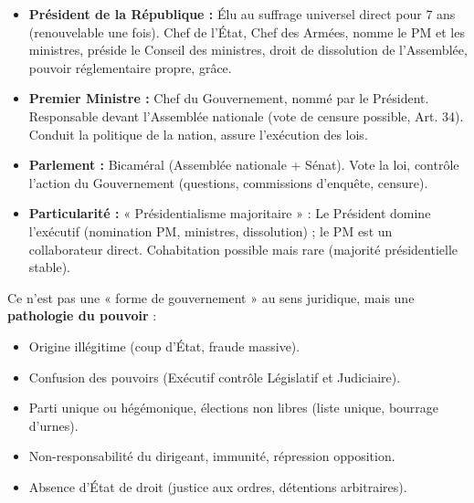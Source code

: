 \documentclass[11pt]{article}
\newcounter{popsec}
\newcounter{popsub}
\newcommand{\courssub}[1]{%
  \stepcounter{popsub}%
  \par\vspace{9pt}\noindent{\popxbold\fontsize{11.5}{13}\selectfont\color{popink}{\color{poporange}\thepopsec.\thepopsub}\hspace{6pt}#1}\par\nopagebreak\vspace{4pt}
}
\begin{document}
\begin{exemplebox}
\begin{itemize}
    \item \textbf{Président de la République :} Élu au suffrage universel direct pour 7 ans (renouvelable une fois). Chef de l'État, Chef des Armées, nomme le PM et les ministres, préside le Conseil des ministres, droit de dissolution de l'Assemblée, pouvoir réglementaire propre, grâce.
    \item \textbf{Premier Ministre :} Chef du Gouvernement, nommé par le Président. Responsable devant l'Assemblée nationale (vote de censure possible, Art. 34). Conduit la politique de la nation, assure l'exécution des lois.
    \item \textbf{Parlement :} Bicaméral (Assemblée nationale + Sénat). Vote la loi, contrôle l'action du Gouvernement (questions, commissions d'enquête, censure).
    \item \textbf{Particularité :} « Présidentialisme majoritaire » : Le Président domine l'exécutif (nomination PM, ministres, dissolution) ; le PM est un collaborateur direct. Cohabitation possible mais rare (majorité présidentielle stable).
\end{itemize}
\end{exemplebox}

\begin{attention}
Ce n'est pas une « forme de gouvernement » au sens juridique, mais une \textbf{pathologie du pouvoir} :
\begin{itemize}
    \item Origine illégitime (coup d'État, fraude massive).
    \item Confusion des pouvoirs (Exécutif contrôle Législatif et Judiciaire).
    \item Parti unique ou hégémonique, élections non libres (liste unique, bourrage d'urnes).
    \item Non-responsabilité du dirigeant, immunité, répression opposition.
    \item Absence d'État de droit (justice aux ordres, détentions arbitraires).
\end{itemize}
\end{attention}

\courssub{Rôle et finalité de l'État}
\end{document}
